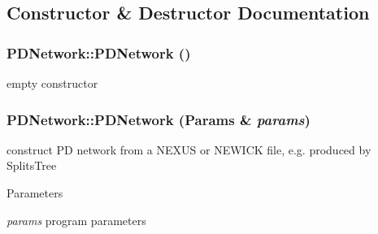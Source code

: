 \subsection{Constructor \& Destructor Documentation}
\hypertarget{classPDNetwork_a26121c6a073dcaabb9c49e2b2144fde4}{
\subsubsection[{PDNetwork}]{\setlength{\rightskip}{0pt plus 5cm}PDNetwork::PDNetwork ()}}
\label{classPDNetwork_a26121c6a073dcaabb9c49e2b2144fde4}
empty constructor \hypertarget{classPDNetwork_aba3316a0d0ed8fb67dce12fd9cc74b39}{
\subsubsection[{PDNetwork}]{\setlength{\rightskip}{0pt plus 5cm}PDNetwork::PDNetwork ({\bf Params} \& {\em params})}}
\label{classPDNetwork_aba3316a0d0ed8fb67dce12fd9cc74b39}
construct PD network from a NEXUS or NEWICK file, e.g. produced by SplitsTree 
\begin{DoxyParams}{Parameters}
\item[{\em params}]program parameters \end{DoxyParams}



